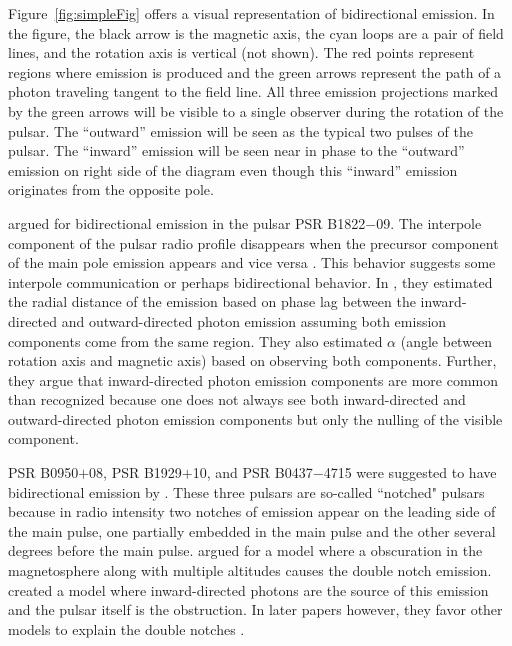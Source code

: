 Figure~\ref{fig:simpleFig} offers a visual representation of bidirectional emission. In the
figure, the black arrow is the magnetic axis, the cyan loops are a pair of
field lines, and the rotation axis is vertical (not shown). The red points
represent regions where emission is produced and the green arrows represent
the path of a photon traveling tangent to the field line. All three emission
projections marked by the green arrows will be visible to a single observer
during the rotation of the pulsar. The ``outward'' emission will be
seen as the typical two pulses of the pulsar. The ``inward'' emission
will be seen near in phase to the ``outward'' emission on right side of
the diagram even though this ``inward'' emission originates from the
opposite pole.


\cite{dyks2005reversals} argued for bidirectional emission in the pulsar PSR B1822$-$09.
The interpole component of the pulsar radio profile disappears when the precursor 
component of the main pole emission appears and vice versa \citep{gil1994multifrequency}.
This behavior suggests some interpole communication or perhaps bidirectional
behavior.  In \cite{dyks2005reversals}, they estimated the radial distance of the emission
based on phase lag between the inward-directed and outward-directed photon emission assuming
both emission components come from the same region. They also estimated $\alpha$
(angle between rotation axis and magnetic axis)
based on observing both components.  Further, they argue that 
inward-directed photon emission components are more common than recognized because one does not always
see both inward-directed and outward-directed photon emission components but only the nulling of the visible 
component.

PSR B0950$+$08, PSR B1929$+$10, and PSR B0437$-$4715 were suggested to have bidirectional emission by 
\cite{dyks2005shadow}.  These three pulsars are so-called ``notched" pulsars \citep{mclaughlin2004notches}
because in radio intensity two notches of emission appear on the leading side of the main pulse,
one partially embedded in the main pulse and the other several degrees before the main
pulse.  \cite{wright2004model} argued for a model where a obscuration in the magnetosphere
along with multiple altitudes causes the double notch emission.  \cite{dyks2005shadow} created
a model where inward-directed photons are the source of this emission and the pulsar
itself is the obstruction.  In later papers however, they favor other models
to explain the double notches \citep{dyks2006model,dyks2012asymmetry}.


